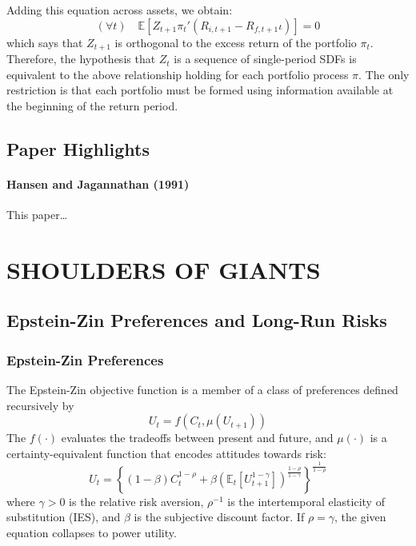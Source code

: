 \documentclass[
]{book}
\begin{document}
Adding this equation across assets, we obtain:
\[
\left(\forall t\right)\quad\mathbb{E}\left[Z_{t+1}\pi_{t}'\left(R_{i,t+1}-R_{f,t+1}\iota\right)\right]=0
\]
which says that \(Z_{t+1}\) is orthogonal to the excess return of the portfolio \(\pi_t\). Therefore, the hypothesis that \(Z_t\) is a sequence of single-period SDFs is equivalent to the above relationship holding for each portfolio process \(\pi\). The only restriction is that each portfolio must be formed using information available at the beginning of the return period.

\hypertarget{paper-highlights}{%
\chapter{Paper Highlights}\label{paper-highlights}}

\hypertarget{hansen-and-jagannathan-1991}{%
\subsection{Hansen and Jagannathan (1991)}\label{hansen-and-jagannathan-1991}}

This paper\ldots{}

\hypertarget{part-shoulders-of-giants}{%
\part*{SHOULDERS OF GIANTS}\label{part-shoulders-of-giants}}

\hypertarget{epstein-zin-preferences-and-long-run-risks}{%
\chapter{Epstein-Zin Preferences and Long-Run Risks}\label{epstein-zin-preferences-and-long-run-risks}}

\hypertarget{epstein-zin-preferences}{%
\section{Epstein-Zin Preferences}\label{epstein-zin-preferences}}

The Epstein-Zin objective function is a member of a class of preferences defined recursively by
\[
U_t = f(C_t, \mu(U_{t+1}))
\]
The \(f(\cdot)\) evaluates the tradeoffs between present and future, and \(\mu(\cdot)\) is a certainty-equivalent function that encodes attitudes towards risk:
\[
U_{t}=\left\{ \left(1-\beta\right)C_{t}^{1-\rho}+\beta\left(\mathbb{E}_{t}\left[U_{t+1}^{1-\gamma}\right]\right)^{\frac{1-\rho}{1-\gamma}}\right\} ^{\frac{1}{1-\rho}}
\]
where \(\gamma>0\) is the relative risk aversion, \(\rho^{-1}\) is the intertemporal elasticity of substitution (IES), and \(\beta\) is the subjective discount factor. If \(\rho = \gamma\), the given equation collapses to power utility.
\end{document}
